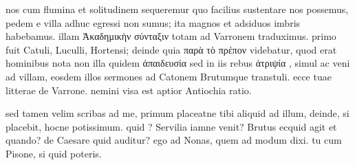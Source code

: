 


 nos cum flumina et solitudinem sequeremur quo facilius sustentare nos possemus, pedem e villa adhuc egressi non sumus; ita magnos et adsiduos imbris habebamus. illam Ἀκαδημικὴν σύνταξιν totam ad Varronem traduximus. primo fuit Catuli, Luculli, Hortensi; deinde quia παρὰ τὸ πρέπον videbatur, quod erat hominibus nota non illa quidem ἀπαιδευσία sed in iis rebus ἀτριψία , simul ac veni ad villam, eosdem illos sermones ad Catonem Brutumque transtuli. ecce tuae litterae de Varrone. nemini visa est aptior Antiochia ratio.

 sed tamen velim scribas ad me, primum placeatne tibi aliquid ad illum, deinde, si placebit, hocne potissimum. quid ? Servilia iamne venit? Brutus ecquid agit et quando? de Caesare quid auditur? ego ad Nonas, quem ad modum dixi. tu cum Pisone, si quid poteris.
